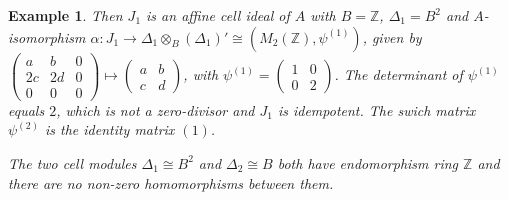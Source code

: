 \documentclass[oneside, a4paper, 11pt]{amsart}
\newtheorem{example}[theorem]{Example}
\newcommand{\asym}{\widehat{A}}
\newcommand{\ZZ}{\mathbb{Z}}
\begin{document}
\begin{example}
    Then $J_1$ is an affine cell ideal of $A$ with $B=\ZZ$, $\Delta_1=B^2$ and $A$-isomorphism $\alpha: J_1 \rightarrow \Delta_1\otimes_B (\Delta_1)' \cong (M_2(\ZZ),\psi^{(1)})$, given by $\left(\begin{array}{ccc} a & b & 0\\ 2c & 2d & 0 \\ 0 & 0 & 0\end{array}\right) \mapsto  \left(\begin{array}{cc} a & b \\ c & d \end{array}\right)$, with 
    $\psi^{(1)} = \left(\begin{array}{cc} 1 & 0 \\ 0 & 2\end{array}\right)$. The determinant of $\psi^{(1)}$ equals $2$, which is not a zero-divisor and $J_1$ is idempotent. The swich
    matrix $\psi^{(2)}$ is the identity matrix $(1)$.  

    The two cell modules $\Delta_1 \cong B^2$ and $\Delta_2 \cong B$ both have
    endomorphism ring $\ZZ$ and there are no non-zero homomorphisms between
    them. 
\end{example}
\end{document}
